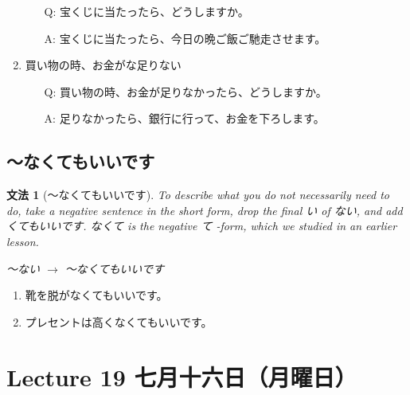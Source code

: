 \documentclass[notoc,notitlepage]{tufte-book}
\newtheorem{grammar}{\faBook \enspace 文法}[section]
\begin{document}
\begin{ex}
\begin{enumerate}
      \begin{itemize}
        \item[Q: ] 宝くじに当たったら、どうしますか。
        \item[A: ] 宝くじに当たったら、今日の晩ご飯ご馳走させます。
      \end{itemize}
    \item 買い物の時、お金がな足りない
      \begin{itemize}
        \item[Q: ] 買い物の時、お金が足りなかったら、どうしますか。
        \item[A: ] 足りなかったら、銀行に行って、お金を下ろします。
      \end{itemize}
  \end{enumerate}
\end{ex}


\section{〜なくてもいいです}%
\label{sec:_nakutemoiidesu}

\begin{grammar}[〜なくてもいいです]
\label{grammar:_nakutemoiidesu}
To describe what you \textit{do not necessarily need to do}, take a negative sentence in the short form, drop the final い of ない, and add くてもいいです. なくて is the negative て -form, which we studied in an earlier lesson.
\begin{center}
  〜ない $\to$ 〜なくてもいいです
\end{center}
\end{grammar}

\begin{eg}
  \begin{enumerate}
    \item 靴を脱がなくてもいいです。
    \item プレセントは高くなくてもいいです。
  \end{enumerate}
\end{eg}



\chapter{Lecture 19 七月十六日（月曜日）}%
\label{chp:lecture_19_qi_yue_shi_liu_ri_yue_yao_ri_}
\end{document}
